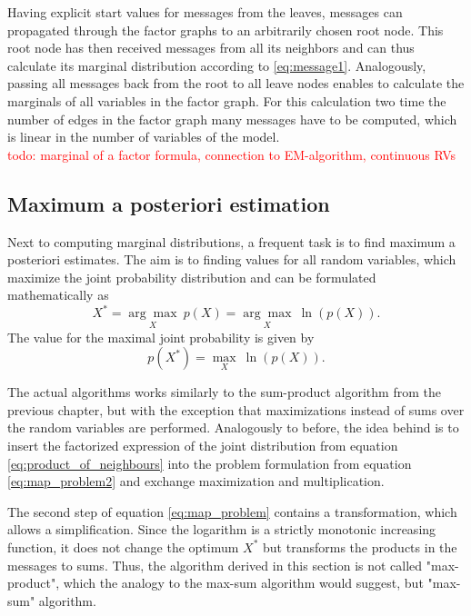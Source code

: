 \documentclass{sigkdd}
\begin{document}
Having explicit start values for messages from the leaves, messages can propagated through the factor graphs to an arbitrarily chosen root node. This root node has then received messages from all its neighbors and can thus calculate its marginal distribution according to \ref{eq:message1}. Analogously, passing all messages back from the root to all leave nodes enables to calculate the marginals of all variables in the factor graph. For this calculation two time the number of edges in the factor graph many messages have to be computed, which is linear in the number of variables of the model.\\
\textcolor{red}{todo: marginal of a factor formula, connection to EM-algorithm, continuous RVs}


\subsection{Maximum a posteriori estimation}
Next to computing marginal distributions, a frequent task is to find maximum a posteriori estimates. The aim is to finding values for all random variables, which maximize the joint probability distribution and can be formulated mathematically as
\begin{equation}\label{eq:map_problem}
X^* = \underset{X}{\arg\max}~ p(X) = \underset{X}{\arg\max}~ \ln (p(X)).
\end{equation}
The value for the maximal joint probability is given by
\begin{equation}\label{eq:map_problem2}
p(X^*) = \underset{X}{\max}~ \ln (p(X)).
\end{equation}


The actual algorithms works similarly to the sum-product algorithm from the previous chapter, but with the exception that maximizations instead of sums over the random variables are performed. Analogously to before, the idea behind is to insert the factorized expression of the joint distribution from equation \ref{eq:product_of_neighbours} into the problem formulation from equation \ref{eq:map_problem2} and exchange maximization and multiplication.

The second step of equation \ref{eq:map_problem} contains a transformation, which allows a simplification. Since the logarithm is a strictly monotonic increasing function, it does not change the optimum $X^*$ but transforms the products in the messages to sums. Thus, the algorithm derived in this section is not called "max-product", which the analogy to the max-sum algorithm would suggest, but "max-sum" algorithm.
\end{document}
